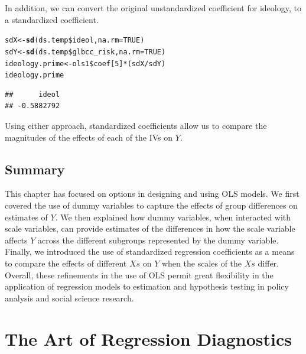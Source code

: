 \documentclass[11pt,openany]{book}\usepackage[]{graphicx}\usepackage[]{color}
\makeatletter
\newcommand{\hlnum}[1]{\textcolor[rgb]{0.686,0.059,0.569}{#1}}%
\newcommand{\hlopt}[1]{\textcolor[rgb]{0,0,0}{#1}}%
\newcommand{\hlstd}[1]{\textcolor[rgb]{0.345,0.345,0.345}{#1}}%
\newcommand{\hlkwb}[1]{\textcolor[rgb]{0.69,0.353,0.396}{#1}}%
\newcommand{\hlkwc}[1]{\textcolor[rgb]{0.333,0.667,0.333}{#1}}%
\newcommand{\hlkwd}[1]{\textcolor[rgb]{0.737,0.353,0.396}{\textbf{#1}}}%
\newenvironment{kframe}{%
 \def\at@end@of@kframe{}%
 \ifinner\ifhmode%
  \def\at@end@of@kframe{\end{minipage}}%
  \begin{minipage}{\columnwidth}%
 \fi\fi%
 \def\FrameCommand##1{\hskip\@totalleftmargin \hskip-\fboxsep
 \colorbox{shadecolor}{##1}\hskip-\fboxsep
     \hskip-\linewidth \hskip-\@totalleftmargin \hskip\columnwidth}%
 \MakeFramed {\advance\hsize-\width
   \@totalleftmargin\z@ \linewidth\hsize
   \@setminipage}}%
 {\par\unskip\endMakeFramed%
 \at@end@of@kframe}
\newenvironment{knitrout}{}{} %
\renewenvironment{knitrout}{\begin{singlespace}}{\end{singlespace}}
\makeatother
\begin{document}
In addition, we can convert the original unstandardized coefficient for ideology, to a standardized coefficient. 
\begin{knitrout}
\color{fgcolor}\begin{kframe}
\begin{alltt}
\hlstd{sdX} \hlkwb{<-} \hlkwd{sd}\hlstd{(ds.temp}\hlopt{\$}\hlstd{ideol,} \hlkwc{na.rm} \hlstd{=} \hlnum{TRUE}\hlstd{)}
\hlstd{sdY} \hlkwb{<-} \hlkwd{sd}\hlstd{(ds.temp}\hlopt{\$}\hlstd{glbcc_risk,} \hlkwc{na.rm} \hlstd{=} \hlnum{TRUE}\hlstd{)}
\hlstd{ideology.prime} \hlkwb{<-} \hlstd{ols1}\hlopt{\$}\hlstd{coef[}\hlnum{5}\hlstd{]} \hlopt{*} \hlstd{(sdX}\hlopt{/}\hlstd{sdY)}
\hlstd{ideology.prime}
\end{alltt}
\begin{verbatim}
##      ideol 
## -0.5882792
\end{verbatim}
\end{kframe}
\end{knitrout}

Using either approach, standardized coefficients allow us to compare the magnitudes of the effects of each of the IVs on $Y$.

\section{Summary}
This chapter has focused on options in designing and using OLS models. We first covered the use of dummy variables to capture the effects of group differences on estimates of $Y$. We then explained how dummy variables, when interacted with scale variables, can provide estimates of the differences in how the scale variable affects $Y$ across the different subgroups represented by the dummy variable. Finally, we introduced the use of standardized regression coefficients as a means to compare the effects of different $Xs$ on $Y$ when the scales of the $Xs$ differ. Overall, these refinements in the use of OLS permit great flexibility in the application of regression models to estimation and hypothesis testing in policy analysis and social science research.






\chapter{The Art of Regression Diagnostics} 
\end{document}
